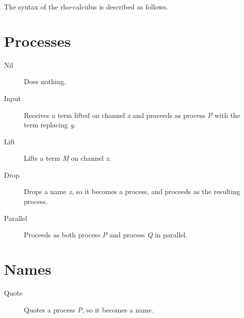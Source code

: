 The syntax of the rho-calculus is described as follows.

\section{Processes}
\begin{description}
\item[Nil] Does nothing.
\item[Input] Receives a term lifted on channel \textit{x} and proceeds as process \textit{P} with the term replacing \textit{y}.
\item[Lift] Lifts a term \textit{M} on channel \textit{x}.
\item[Drop] Drops a name \textit{x}, so it becomes a process, and proceeds as the resulting process.
\item[Parallel] Proceeds as both process \textit{P} and process \textit{Q} in parallel.
\end{description}


\section{Names}
\begin{description}
\item[Quote] Quotes a process \textit{P}, so it becomes a name.
\end{description}


